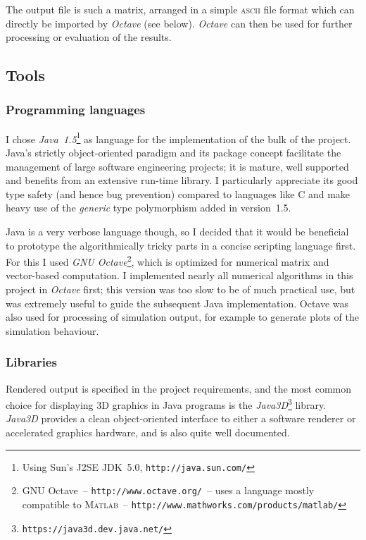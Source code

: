 The output file is such a matrix, arranged in a simple \textsc{ascii} file format which can
directly be imported by \textsl{Octave} (see below). \textsl{Octave} can then be used for further
processing or evaluation of the results.

\subsection{Tools}
\subsubsection{Programming languages}
I chose \textsl{Java~1.5}\footnote{Using Sun's J2SE JDK~5.0, \texttt{http://java.sun.com/}}
as language for the implementation of the bulk of the project. Java's strictly object-oriented
paradigm and its package concept facilitate the management of large software engineering
projects; it is mature, well supported and benefits from an extensive run-time library. I
particularly appreciate its good type safety (and hence bug prevention) compared to languages
like C and make heavy use of the \emph{generic} type polymorphism added in version~1.5.

Java is a very verbose language though, so I decided that it would be beneficial to prototype
the algorithmically tricky parts in a concise scripting language first. For this I used
\textsl{GNU Octave}\footnote{GNU Octave~-- \texttt{http://www.octave.org/}~-- uses a language
mostly compatible to \textsc{Matlab}~-- \texttt{http://www.mathworks.com/products/matlab/}},
which is optimized for numerical matrix and vector-based computation. I implemented nearly all
numerical algorithms in this project in \textsl{Octave} first; this version was too slow to be
of much practical use, but was extremely useful to guide the subsequent Java implementation.
Octave was also used for processing of simulation output, for example to generate plots of the
simulation behaviour.

\subsubsection{Libraries}
Rendered output is specified in the project requirements, and the most common choice for
displaying 3D graphics in Java programs is the
\textsl{Java3D}\footnote{\texttt{https://java3d.dev.java.net/}} library. \textsl{Java3D} provides
a clean object-oriented interface to either a software renderer or accelerated graphics hardware,
and is also quite well documented.

